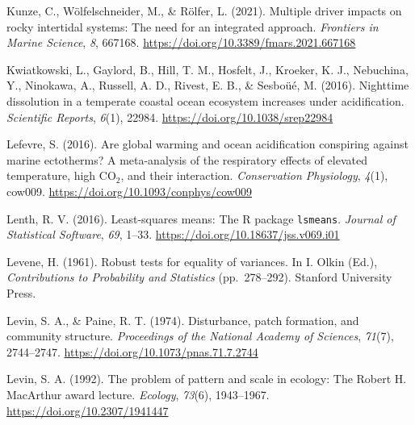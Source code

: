 \documentclass{CSUNthesis}
\begin{document}
\vspace{0.1em}

Kunze, C., Wölfelschneider, M., \& Rölfer, L. (2021). Multiple driver impacts on rocky intertidal systems: The need for an integrated approach. \textit{Frontiers in Marine Science}, \textit{8}, 667168. \url{https://doi.org/10.3389/fmars.2021.667168}

\vspace{0.1em}

Kwiatkowski, L., Gaylord, B., Hill, T. M., Hosfelt, J., Kroeker, K. J., Nebuchina, Y., Ninokawa, A., Russell, A. D., Rivest, E. B., \& Sesboüé, M. (2016). Nighttime dissolution in a temperate coastal ocean ecosystem increases under acidification. \textit{Scientific Reports}, \textit{6}(1), 22984. \url{https://doi.org/10.1038/srep22984}

\vspace{0.1em}

Lefevre, S. (2016). Are global warming and ocean acidification conspiring against marine ectotherms? A meta-analysis of the respiratory effects of elevated temperature, high CO\(_2\), and their interaction. \textit{Conservation Physiology}, \textit{4}(1), cow009. \url{https://doi.org/10.1093/conphys/cow009}

\vspace{0.1em}

Lenth, R. V. (2016). Least-squares means: The R package \texttt{lsmeans}. \textit{Journal of Statistical Software}, \textit{69}, 1--33. \url{https://doi.org/10.18637/jss.v069.i01}

\vspace{0.1em}

Levene, H. (1961). Robust tests for equality of variances. In I. Olkin (Ed.), \textit{Contributions to Probability and Statistics} (pp.~278--292). Stanford University Press.

\vspace{0.1em}

Levin, S. A., \& Paine, R. T. (1974). Disturbance, patch formation, and community structure. \textit{Proceedings of the National Academy of Sciences}, \textit{71}(7), 2744--2747. \url{https://doi.org/10.1073/pnas.71.7.2744}

\vspace{0.1em}

Levin, S. A. (1992). The problem of pattern and scale in ecology: The Robert H. MacArthur award lecture. \textit{Ecology}, \textit{73}(6), 1943--1967. \url{https://doi.org/10.2307/1941447}
\end{document}
